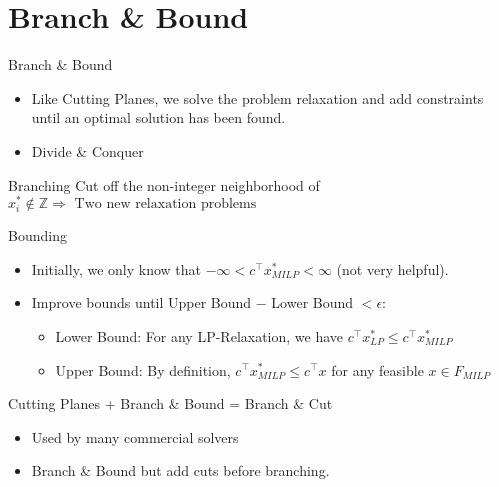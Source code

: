 \section{Branch \& Bound}

\begin{frame}{Branch \& Bound}
\begin{itemize}
\item Like Cutting Planes, we solve the problem relaxation and add constraints until an optimal solution has been found.
\item Divide \& Conquer
\end{itemize}
\end{frame}

\begin{frame}{Branching}
Cut off the non-integer neighborhood of $x_i^* \notin \mathbb{Z} \Rightarrow \text{ Two new relaxation problems}$
\end{frame}

\begin{frame}{Bounding}
\begin{itemize}
\item Initially, we only know that $-\infty < c^\top x_{MILP}^* < \infty$ (not very helpful).
\item Improve bounds until Upper Bound $-$ Lower Bound $< \epsilon$:
\begin{itemize}
\item Lower Bound: For any LP-Relaxation, we have $c^\top x_{LP}^* \leq c^\top x_{MILP}^*$
\item Upper Bound: By definition, $c^\top x_{MILP}^* \leq c^\top x$ for any feasible $x \in F_{MILP}$
\end{itemize}

\end{itemize}
\end{frame}

\begin{frame}{Cutting Planes + Branch \& Bound = Branch \& Cut }
\begin{itemize}
\item Used by many commercial solvers %
\item Branch \& Bound but add cuts before branching.
\end{itemize}
\end{frame}